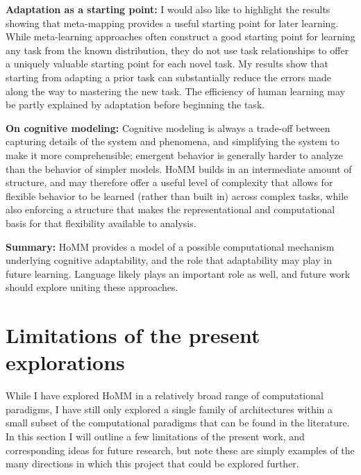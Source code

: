 \textbf{Adaptation as a starting point:} I would also like to highlight the results showing that meta-mapping provides a useful starting point for later learning. While meta-learning approaches often construct a good starting point for learning any task from the known distribution, they do not use task relationships to offer a uniquely valuable starting point for each novel task. My results show that starting from adapting a prior task can substantially reduce the errors made along the way to mastering the new task. The efficiency of human learning may be partly explained by adaptation before beginning the task. \par 

\textbf{On cognitive modeling:} Cognitive modeling is always a trade-off between capturing details of the system and phenomena, and simplifying the system to make it more comprehensible; emergent behavior is generally harder to analyze than the behavior of simpler models. HoMM builds in an intermediate amount of structure, and may therefore offer a useful level of complexity that allows for flexible behavior to be learned (rather than built in) across complex tasks, while also enforcing a structure that makes the representational and computational basis for that flexibility available to analysis. \par

\textbf{Summary:} HoMM provides a model of a possible computational mechanism underlying cognitive adaptability, and the role that adaptability may play in future learning. Language likely plays an important role as well, and future work should explore uniting these approaches. 

\section{Limitations of the present explorations}

While I have explored HoMM in a relatively broad range of computational paradigms, I have still only explored a single family of architectures within a small subset of the computational paradigms that can be found in the literature. In this section I will outline a few limitations of the present work, and corresponding ideas for future research, but note these are simply examples of the many directions in which this project that could be explored further. \par

